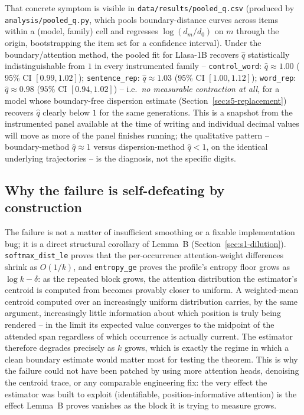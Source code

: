 \documentclass[11pt]{article}
\begin{document}
That concrete symptom is visible in \texttt{data/results/pooled\_q.csv}
(produced by \texttt{analysis/pooled\_q.py}, which pools boundary-distance
curves across items within a (model, family) cell and regresses
$\log(d_m/d_0)$ on $m$ through the origin, bootstrapping the item set for a
confidence interval). Under the boundary/attention method, the pooled fit for
Llasa-1B recovers $\hat q$ statistically indistinguishable from $1$ in every
instrumented family -- \texttt{control\_word}: $\hat q \approx 1.00$ ($95\%$
CI $[0.99, 1.02]$); \texttt{sentence\_rep}: $\hat q \approx 1.03$ ($95\%$ CI
$[1.00, 1.12]$); \texttt{word\_rep}: $\hat q \approx 0.98$ ($95\%$ CI
$[0.94, 1.02]$) -- i.e.\ \emph{no measurable contraction at all}, for a
model whose boundary-free dispersion estimate (Section~\ref{sec:s5-replacement})
recovers $\hat q$ clearly below $1$ for the same generations. This is a
snapshot from the instrumented panel available at the time of writing and
individual decimal values will move as more of the panel finishes running;
the qualitative pattern -- boundary-method $\hat q \approx 1$ versus
dispersion-method $\hat q < 1$, on the identical underlying trajectories -- is
the diagnosis, not the specific digits.

\subsection{Why the failure is self-defeating by construction}

The failure is not a matter of insufficient smoothing or a fixable
implementation bug; it is a direct structural corollary of Lemma~B
(Section~\ref{sec:s1-dilution}). \texttt{softmax\_dist\_le} proves that the
per-occurrence attention-weight differences shrink as $O(1/k)$, and
\texttt{entropy\_ge} proves the profile's entropy floor grows as $\log k -
\delta$: as the repeated block grows, the attention distribution the
estimator's centroid is computed from becomes provably closer to uniform. A
weighted-mean centroid computed over an increasingly uniform distribution
carries, by the same argument, increasingly little information about which
position is truly being rendered -- in the limit its expected value converges
to the midpoint of the attended span regardless of which occurrence is
actually current. The estimator therefore degrades precisely as $k$ grows,
which is exactly the regime in which a clean boundary estimate would matter
most for testing the theorem. This is why the failure could not have been
patched by using more attention heads, denoising the centroid trace, or any
comparable engineering fix: the very effect the estimator was built to
exploit (identifiable, position-informative attention) is the effect Lemma~B
proves vanishes as the block it is trying to measure grows.
\end{document}
